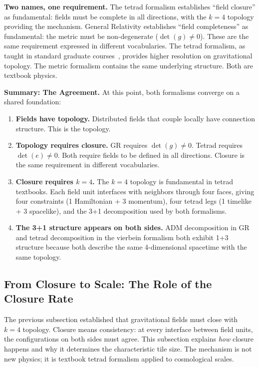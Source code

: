 \documentclass[aps,prd,preprint,superscriptaddress,showpacs,preprintnumbers,amsmath,amssymb,nofootinbib]{revtex4-2}
\begin{document}
\textbf{Two names, one requirement.} The tetrad formalism establishes ``field closure'' as fundamental: fields must be complete in all directions, with the $k=4$ topology providing the mechanism. General Relativity establishes ``field completeness'' as fundamental: the metric must be non-degenerate ($\det(g) \neq 0$). These are the same requirement expressed in different vocabularies. The tetrad formalism, as taught in standard graduate courses~\cite{mtw1973,wald1984}, provides higher resolution on gravitational topology. The metric formalism contains the same underlying structure. Both are textbook physics.

\textbf{Summary: The Agreement.} At this point, both formalisms converge on a shared foundation:
\begin{enumerate}
\item \textbf{Fields have topology.} Distributed fields that couple locally have connection structure. This is the topology.
\item \textbf{Topology requires closure.} GR requires $\det(g) \neq 0$. Tetrad requires $\det(e) \neq 0$. Both require fields to be defined in all directions. Closure is the same requirement in different vocabularies.
\item \textbf{Closure requires $k=4$.} The $k=4$ topology is fundamental in tetrad textbooks. Each field unit interfaces with neighbors through four faces, giving four constraints (1 Hamiltonian + 3 momentum), four tetrad legs (1 timelike + 3 spacelike), and the 3+1 decomposition used by both formalisms.
\item \textbf{The 3+1 structure appears on both sides.} ADM decomposition in GR and tetrad decomposition in the vierbein formalism both exhibit 1+3 structure because both describe the same 4-dimensional spacetime with the same topology.
\end{enumerate}

\subsection{From Closure to Scale: The Role of the Closure Rate}
\label{subsec:closure-rate}

The previous subsection established that gravitational fields must close with $k=4$ topology. Closure means consistency: at every interface between field units, the configurations on both sides must agree. This subsection explains \emph{how} closure happens and why it determines the characteristic tile size. The mechanism is not new physics; it is textbook tetrad formalism applied to cosmological scales.
\end{document}
